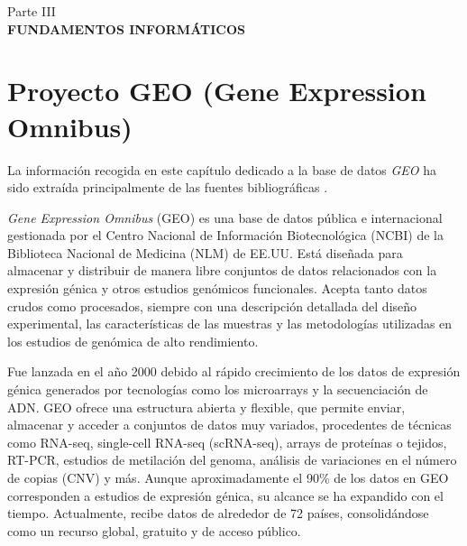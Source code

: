 \newpage
\thispagestyle{empty}
\vspace*{\fill}
\begin{center}
    \large Parte III \\
    \vspace{0.5cm}           
    \LARGE \textbf{FUNDAMENTOS INFORMÁTICOS}
\end{center}
\vspace*{\fill}
\newpage


\chapter{Proyecto GEO (Gene Expression Omnibus)}

La información recogida en este capítulo dedicado a la base de datos \textit{GEO} ha sido extraída principalmente de las fuentes bibliográficas 
\cite{geo-1,geo-2,geo-3,geo-4,geo-overview}. \newline

\textit{Gene Expression Omnibus} (GEO) es una base de datos pública e internacional gestionada por el Centro Nacional de Información 
Biotecnológica (NCBI) de la Biblioteca Nacional de Medicina (NLM) de EE.UU.
Está diseñada para almacenar y distribuir de manera libre conjuntos de datos relacionados con la expresión génica y otros estudios 
genómicos funcionales. Acepta tanto datos crudos como procesados, siempre con una descripción detallada del 
diseño experimental, las características de las muestras y las metodologías utilizadas en los estudios de genómica de alto rendimiento. \newline

Fue lanzada en el año 2000 debido al rápido crecimiento de los datos de expresión génica generados por tecnologías como los microarrays y la secuenciación 
de ADN. GEO ofrece una estructura abierta y flexible, que permite enviar, almacenar y acceder a conjuntos de datos muy variados, procedentes de 
técnicas como RNA-seq, single-cell RNA-seq (scRNA-seq), arrays de proteínas o tejidos, RT-PCR, estudios de metilación del genoma, análisis de 
variaciones en el número de copias (CNV) y más. Aunque aproximadamente el 90\% de los datos en GEO corresponden a estudios de expresión génica, 
su alcance se ha expandido con el tiempo. Actualmente, recibe datos de alrededor de 72 países, consolidándose como un recurso global, gratuito 
y de acceso público. \newline

